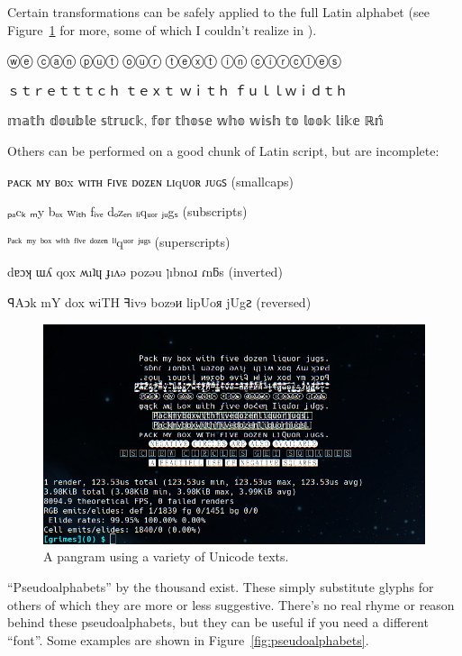 Certain transformations can be safely applied to the full Latin alphabet
(see Figure~\ref{fig:unicodeweird} for more, some of which I couldn't
realize in \XeLaTeX).

\begin{denseitemize}
\item{{ⓦⓔ ⓒⓐⓝ ⓟⓤⓣ ⓞⓤⓡ ⓣⓔⓧⓣ ⓘⓝ ⓒⓘⓡⓒⓛⓔⓢ}}
\item{ｓｔｒｅｔｔｔｃｈ ｔｅｘｔ ｗｉｔｈ ｆｕｌｌｗｉｄｔｈ}
\item{{𝕞𝕒𝕥𝕙 𝕕𝕠𝕦𝕓𝕝𝕖 𝕤𝕥𝕣𝕦𝕔𝕜, 𝕗𝕠𝕣 𝕥𝕙𝕠𝕤𝕖 𝕨𝕙𝕠 𝕨𝕚𝕤𝕙 𝕥𝕠 𝕝𝕠𝕠𝕜 𝕝𝕚𝕜𝕖 ℝ\^𝕟}}
\end{denseitemize}

Others can be performed on a good chunk of Latin script, but are incomplete:

\begin{denseitemize}
\item{{ᴘᴀᴄᴋ ᴍʏ ʙᴏx ᴡɪᴛʜ ꜰɪᴠᴇ ᴅᴏᴢᴇɴ ʟɪqᴜᴏʀ ᴊᴜɢꜱ (smallcaps)}}
\item{{ₚₐcₖ ₘy bₒₓ wᵢₜₕ fᵢᵥₑ dₒzₑₙ ₗᵢqᵤₒᵣ ⱼᵤgₛ (subscripts)}}
\item{{ᴾᵃᶜᵏ ᵐʸ ᵇᵒˣ ʷⁱᵗʰ ᶠⁱᵛᵉ ᵈᵒᶻᵉⁿ ˡⁱqᵘᵒʳ ʲᵘᵍˢ (superscripts)}}
\item{{dɐɔʞ ɯʎ qox ʍıʇɥ ɟıʌǝ pozǝu ןıbnoɹ ɾnƃs (inverted)}}
\item{{ꟼAↄk mY dox wiTH ꟻivɘ bozɘᴎ lipUoᴙ jUgꙅ (reversed)}}
\end{denseitemize}

\begin{figure}[!htb]
    \centering
    \includegraphics[width=.75\linewidth]{media/unicode-weird.png}
    \caption{A pangram using a variety of Unicode texts.}
    \label{fig:unicodeweird}
\end{figure}

``Pseudoalphabets'' by the thousand exist. These simply substitute glyphs for
others of which they are more or less suggestive. There's no real rhyme or
reason behind these pseudoalphabets, but they can be useful if you need a
different ``font''. Some examples are shown in Figure~\ref{fig:pseudoalphabets}.

